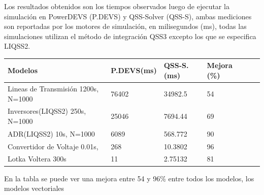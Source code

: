 	Los resultados obtenidos son los tiempos observados luego de ejecutar la simulación en PowerDEVS (P.DEVS) y QSS-Solver (QSS-S), ambas mediciones
	son reportadas por los motores de simulación, en milisegundos (ms), todas las simulaciones utilizan el método de integración QSS3 excepto los que 
	se especifica LIQSS2.

\begin{table}[H]
\centering	
\label{my-label}
\begin{tabular}{llllll}
\toprule
{\bf Modelos}            &  {\bf P.DEVS(ms)} & {\bf QSS-S. (ms)} & {\bf Mejora (\%)} \\
\toprule
Lineas de Transmisión 1200s, N=1000     & 76402         & 34982.5         & 54          \\
Inversores(LIQSS2) 250s, N=1000   	& 25046         & 7694.44         & 69        \\
ADR(LIQSS2) 10s, N=1000 		& 6089          & 568.772         & 90        \\
Convertidor de Voltaje 0.01s,        	& 268           & 10.3802         & 96         \\
Lotka  Voltera 300s      		& 11            & 2.75132         & 81

\end{tabular}
\end{table}

	En la tabla se puede ver una mejora entre 54 y 96\% entre todos los modelos, los modelos vectoriales 
